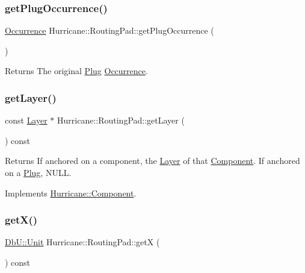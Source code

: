 \subsubsection{\texorpdfstring{get\+Plug\+Occurrence()}{getPlugOccurrence()}}
{\footnotesize\ttfamily \hyperlink{classHurricane_1_1Occurrence}{Occurrence} Hurricane\+::\+Routing\+Pad\+::get\+Plug\+Occurrence (\begin{DoxyParamCaption}{ }\end{DoxyParamCaption})}

\begin{DoxyReturn}{Returns}
The original \hyperlink{classHurricane_1_1Plug}{Plug} \hyperlink{classHurricane_1_1Occurrence}{Occurrence}. 
\end{DoxyReturn}
\mbox{\label{classHurricane_1_1RoutingPad_a7f1e300e4148556fa223e623738d79d4}} 
\subsubsection{\texorpdfstring{get\+Layer()}{getLayer()}}
{\footnotesize\ttfamily const \hyperlink{classHurricane_1_1Layer}{Layer} $\ast$ Hurricane\+::\+Routing\+Pad\+::get\+Layer (\begin{DoxyParamCaption}{ }\end{DoxyParamCaption}) const\hspace{0.3cm}{\ttfamily [virtual]}}

\begin{DoxyReturn}{Returns}
If anchored on a component, the \hyperlink{classHurricane_1_1Layer}{Layer} of that \hyperlink{classHurricane_1_1Component}{Component}. If anchored on a \hyperlink{classHurricane_1_1Plug}{Plug}, {\ttfamily N\+U\+LL}. 
\end{DoxyReturn}


Implements \hyperlink{classHurricane_1_1Component_ab451ef19059e6e5bbb77ae391d02a039}{Hurricane\+::\+Component}.

\mbox{\label{classHurricane_1_1RoutingPad_a5c9c00c648bd0d24e1a8b0876ab442df}} 
\subsubsection{\texorpdfstring{get\+X()}{getX()}}
{\footnotesize\ttfamily \hyperlink{group__DbUGroup_ga4fbfa3e8c89347af76c9628ea06c4146}{Db\+U\+::\+Unit} Hurricane\+::\+Routing\+Pad\+::getX (\begin{DoxyParamCaption}{ }\end{DoxyParamCaption}) const\hspace{0.3cm}{\ttfamily [virtual]}}

